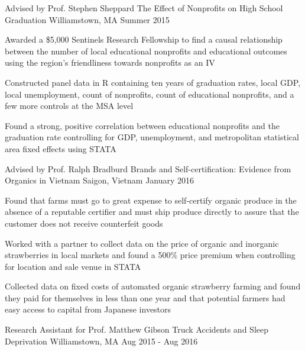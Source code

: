 \begin{cventries}
    \cventry
    {Advised by Prof. Stephen Sheppard}
    {The Effect of Nonprofits on High School Graduation}
    {Williamstown, MA}
    {Summer 2015}
    {
      \begin{cvitems}
      \item {Awarded a \$5,000 Sentinels Research Fellowship to find a causal relationship between the number of local educational nonprofits and educational outcomes using the region's friendliness towards nonprofits as an IV}
      \item {Constructed panel data in R containing ten years of graduation rates, local GDP, local unemployment, count of nonprofits, count of educational nonprofits, and a few more controls at the MSA level}
      \item {Found a strong, positive correlation between educational nonprofits and the graduation rate controlling for GDP, unemployment, and metropolitan statistical area fixed effects using STATA}
      \end{cvitems}
      }
    \cventry
    {Advised by Prof. Ralph Bradburd}
    {Brands and Self-certification: Evidence from Organics in Vietnam}
    {Saigon, Vietnam}
    {January 2016}
    {
      \begin{cvitems}
        \item {Found that farms must go to great expense to self-certify organic produce in the absence of a reputable certifier and must ship produce directly to assure that the customer does not receive counterfeit goods}
        \item {Worked with a partner to collect data on the price of organic and inorganic strawberries in local markets and found a 500\% price premium when controlling for location and sale venue in STATA}
        \item {Collected data on fixed costs of automated organic strawberry farming and found they paid for themselves in less than one year and that potential farmers had easy access to capital from Japanese investors}
      \end{cvitems}
    }
  \cventry
    {Research Assistant for Prof. Matthew Gibson}
    {Truck Accidents and Sleep Deprivation}
    {Williamstown, MA}
    {Aug 2015 - Aug 2016}
    {
      \begin{cvitems}

\end{cvitems}}
\end{cventries}
